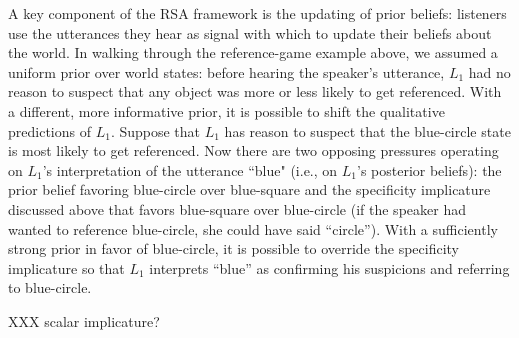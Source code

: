 \documentclass{sp}
\begin{document}
A key component of the RSA framework is the updating of prior beliefs: listeners use the utterances they hear as signal with which to update their beliefs about the world. In walking through the reference-game example above, we assumed a uniform prior over world states: before hearing the speaker's utterance, $L_1$ had no reason to suspect that any object was more or less likely to get referenced. With a different, more informative prior, it is possible to shift the qualitative predictions of $L_1$. Suppose that $L_1$ has reason to suspect that the blue-circle state is most likely to get referenced. Now there are two opposing pressures operating on $L_1$'s interpretation of the utterance ``blue" (i.e., on $L_1$'s posterior beliefs): the prior belief favoring blue-circle over blue-square and the specificity implicature discussed above that favors blue-square over blue-circle (if the speaker had wanted to reference blue-circle, she could have said ``circle''). With a sufficiently strong prior in favor of blue-circle, it is possible to override the specificity implicature so that $L_1$ interprets ``blue'' as confirming his suspicions and referring to blue-circle.

XXX scalar implicature?
\end{document}
